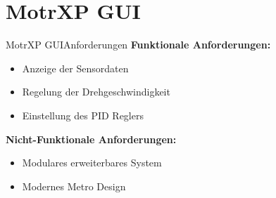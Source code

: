 \section{MotrXP GUI}

		\begin{frame}{MotrXP GUI}{Anforderungen}
		\textbf{Funktionale Anforderungen:}
	  		\begin{itemize}
	   	 		\item Anzeige der Sensordaten
	    		\item Regelung der Drehgeschwindigkeit
	    		\item Einstellung des PID Reglers
	  		\end{itemize}
	  		\textbf{Nicht-Funktionale Anforderungen:}
	  		\begin{itemize}
	   	 		\item Modulares erweiterbares System 
	    		\item Modernes Metro Design
	  		\end{itemize}
		\end{frame}

